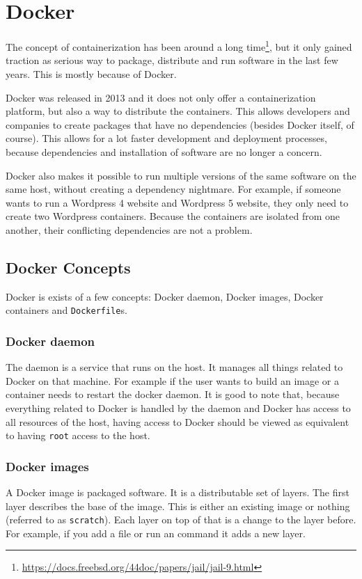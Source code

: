 \section{Docker}
The concept of containerization has been around a long time\footnote{\url{https://docs.freebsd.org/44doc/papers/jail/jail-9.html}}, but it only gained traction as serious way to package, distribute and run software in the last few years. This is mostly because of Docker.

\hfill

Docker was released in 2013 and it does not only offer a containerization platform, but also a way to distribute the containers. This allows developers and companies to create packages that have no dependencies (besides Docker itself, of course). This allows for a lot faster development and deployment processes, because dependencies and installation of software are no longer a concern.

\hfill

Docker also makes it possible to run multiple versions of the same software on the same host, without creating a dependency nightmare. For example, if someone wants to run a Wordpress 4 website and Wordpress 5 website, they only need to create two Wordpress containers. Because the containers are isolated from one another, their conflicting dependencies are not a problem.

\subsection{Docker Concepts}
Docker is exists of a few concepts: Docker daemon, Docker images, Docker containers and \lstinline{Dockerfile}s.

\subsubsection{Docker daemon}
The daemon is a service that runs on the host. It manages all things related to Docker on that machine. For example if the user wants to build an image or a container needs to restart the docker daemon. It is good to note that, because everything related to Docker is handled by the daemon and Docker has access to all resources of the host, having access to Docker should be viewed as equivalent to having \lstinline{root} access to the host\cite{Docker-Daemon-Attack-Surface}.

\subsubsection{Docker images}
A Docker image is packaged software. It is a distributable set of layers. The first layer describes the base of the image. This is either an existing image or nothing (referred to as \lstinline{scratch}). Each layer on top of that is a change to the layer before. For example, if you add a file or run an command it adds a new layer.

